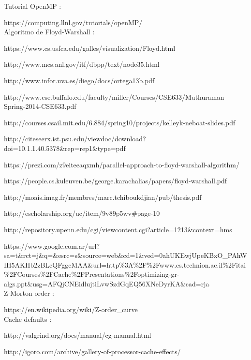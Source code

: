 \documentclass[a4paper,11pt]{article}
\begin{document}
Tutorial OpenMP :

https://computing.llnl.gov/tutorials/openMP/\\

\noindent Algoritmo de Floyd-Warshall :

https://www.cs.usfca.edu/galles/visualization/Floyd.html

http://www.mcs.anl.gov/itf/dbpp/text/node35.html

http://www.infor.uva.es/diego/docs/ortega13b.pdf

http://www.cse.buffalo.edu/faculty/miller/Courses/CSE633/Muthuraman-Spring-2014-CSE633.pdf

http://courses.csail.mit.edu/6.884/spring10/projects/kelleyk-neboat-slides.pdf

http://citeseerx.ist.psu.edu/viewdoc/download?doi=10.1.1.40.5378\&rep=rep1\&type=pdf

https://prezi.com/z9eiteeaqxmh/parallel-approach-to-floyd-warshall-algorithm/

https://people.cs.kuleuven.be/george.karachalias/papers/floyd-warshall.pdf

http://moais.imag.fr/membres/marc.tchiboukdjian/pub/thesis.pdf

http://escholarship.org/uc/item/9v89p5wv\#page-10

http://repository.upenn.edu/cgi/viewcontent.cgi?article=1213\&context=hms

https://www.google.com.ar/url?sa=t\&rct=j\&q=\&esrc=s\&source=web\&cd=1\&ved=0ahUKEwjUpeKBxO\_PAhWIH5AKHb2zBLcQFggcMAA\&url=http\%3A\%2F\%2Fwww.cs.technion.ac.il\%2Fitai\%2FCourses\%2FCache\%2FPresentations\%2Foptimizing-gr-algs.ppt\&usg=AFQjCNEidlujtiLvwSzdGqEQ56XNeDyrKA\&cad=rja\\


\noindent Z-Morton order :

https://en.wikipedia.org/wiki/Z-order\_curve\\


\noindent Cache defaults :

http://valgrind.org/docs/manual/cg-manual.html

http://igoro.com/archive/gallery-of-processor-cache-effects/
\end{document}
